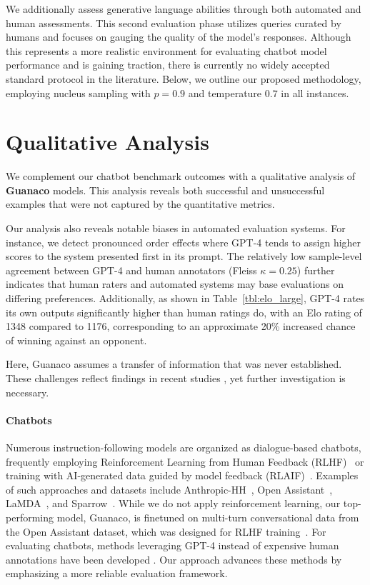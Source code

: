We additionally assess generative language abilities through both automated and human assessments. This second evaluation phase utilizes queries curated by humans and focuses on gauging the quality of the model's responses. Although this represents a more realistic environment for evaluating chatbot model performance and is gaining traction, there is currently no widely accepted standard protocol in the literature. Below, we outline our proposed methodology, employing nucleus sampling with $p=0.9$ and temperature $0.7$ in all instances.

\section{Qualitative Analysis}

We complement our chatbot benchmark outcomes with a qualitative analysis of \textbf{Guanaco} models. This analysis reveals both successful and unsuccessful examples that were not captured by the quantitative metrics.

Our analysis also reveals notable biases in automated evaluation systems. For instance, we detect pronounced order effects where GPT-4 tends to assign higher scores to the system presented first in its prompt. The relatively low sample-level agreement between GPT-4 and human annotators (Fleiss $\kappa=0.25$) further indicates that human raters and automated systems may base evaluations on differing preferences. Additionally, as shown in Table~\ref{tbl:elo_large}, GPT-4 rates its own outputs significantly higher than human ratings do, with an Elo rating of 1348 compared to 1176, corresponding to an approximate 20\% increased chance of winning against an opponent.

Here, {Guanaco} assumes a transfer of information that was never established. These challenges reflect findings in recent studies \cite{sap2022neural}, yet further investigation is necessary.

\paragraph{Chatbots} Numerous instruction-following models are organized as dialogue-based chatbots, frequently employing Reinforcement Learning from Human Feedback (RLHF)~\citep{christiano2017deep} or training with AI-generated data guided by model feedback (RLAIF)~\citep{bai2022constitutional}. Examples of such approaches and datasets include Anthropic-HH~\citep{askell2021general,bai2022training}, Open Assistant~\citep{kopf2023openassistant}, LaMDA~\citep{thoppilan2022lamda}, and Sparrow~\citep{glaese2022improving}. While we do not apply reinforcement learning, our top-performing model, Guanaco, is finetuned on multi-turn conversational data from the Open Assistant dataset, which was designed for RLHF training~\citep{kopf2023openassistant}. For evaluating chatbots, methods leveraging GPT-4 instead of expensive human annotations have been developed \citep{vicuna2023,peng2023instruction}. Our approach advances these methods by emphasizing a more reliable evaluation framework.


